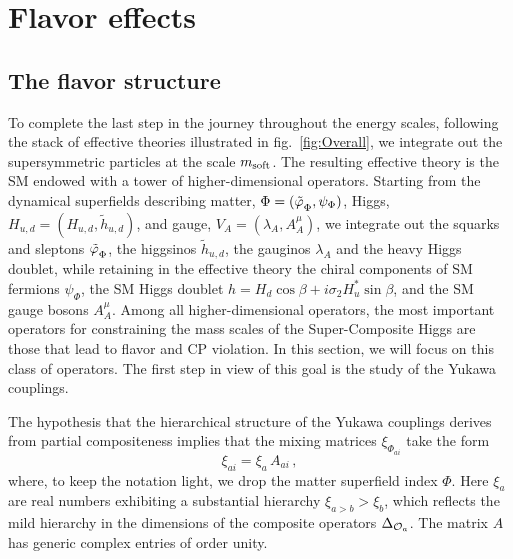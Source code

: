 \documentclass[a4paper,12pt]{article}
\newcommand{\beq}{\begin{equation}}
\newcommand{\eeq}{\end{equation}}
\def\fig#1{fig.~\ref{#1}}
\def\fig#1{fig.~\ref{#1}}
\def\msoft{m_{\rm soft}}
\def\scalar#1{{\tilde \varphi}_{\raisebox{-2pt}{$\scriptstyle {#1}$}}}
\begin{document}
\boldmath
\section{Flavor effects}
\unboldmath
\label{sec:flavor}

\subsection{The flavor structure}
\label{sec:flavstruc}

To complete the last step in the journey throughout the energy scales, following the stack of effective theories illustrated in \fig{fig:Overall}, we integrate out the supersymmetric particles at the scale $\msoft$. The resulting effective theory is the SM endowed with a tower of higher-dimensional operators. Starting from the dynamical superfields describing matter, $\Phi =(\scalar{\Phi}, \psi_\Phi)$, Higgs, $H_{u,d}=(H_{u,d},{\tilde h}_{u,d})$, and gauge, $V_A=({\lambda}_A,A_A^\mu)$,  we integrate out the squarks and sleptons $\scalar{\Phi}$, the higgsinos ${\tilde h}_{u,d}$, the gauginos ${\lambda}_A$ and the heavy Higgs doublet, while retaining in the effective theory the chiral components of SM fermions $\psi_\Phi$, the SM Higgs doublet $h= H_d \cos\beta +i \sigma_2 H_u^* \sin \beta$, and the SM gauge bosons $A_A^\mu$. Among all higher-dimensional operators, the most important operators for constraining the mass scales of the Super-Composite Higgs are those that lead to flavor and CP violation. In this section, we will focus on this class of operators. The first step in view of this goal is the study of the Yukawa couplings.

The hypothesis that the hierarchical structure of the Yukawa couplings derives from partial compositeness implies that the mixing matrices $\xi_{\Phi_{ai}}$ take the form
\beq
\xi_{ai} = \xi_a \, A_{ai} \, ,
\label{partz}
\eeq
where, to keep the notation light, we drop the matter superfield index $\Phi$. Here $\xi_a$ are real numbers exhibiting a substantial hierarchy $\xi_{a>b}>\xi_b$, which reflects the mild hierarchy in the dimensions of the composite operators $\Delta_{{\cal O}_a}$. The matrix $A$ has generic complex entries of order unity.
\end{document}
